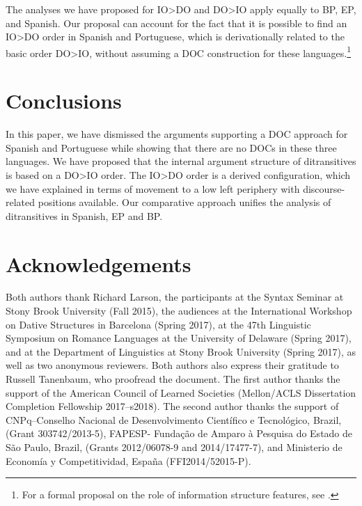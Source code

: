 \documentclass[output=paper,colorlinks,citecolor=brown,nonflat]{./langscibook}
\begin{document}
The analyses we have proposed for IO>DO and DO>IO apply equally to BP, EP, and Spanish. Our proposal can account for the fact that it is possible to find an IO>DO order in Spanish and Portuguese, which is derivationally related to the basic order DO>IO, without assuming a DOC construction for these languages.\footnote{For a formal proposal on the role of information structure features, see \citet{CépedaCyrino2017}.}

\section{Conclusions}\label{sec:cepeda:4}

In this paper, we have dismissed the arguments supporting a DOC approach for Spanish and Portuguese while showing that there are no DOCs in these three languages. We have proposed that the internal argument structure of ditransitives is based on a DO>IO order. The IO>DO order is a derived configuration, which we have explained in terms of movement to a low left periphery with discourse-related positions available. Our comparative approach unifies the analysis of ditransitives in Spanish, EP and BP.


\section*{Acknowledgements}
Both authors thank Richard Larson, the participants at the Syntax Seminar at Stony Brook University (Fall 2015), the audiences at the International Workshop on Dative Structures in Barcelona (Spring 2017), at the 47th Linguistic Symposium on Romance Languages at the University of Delaware (Spring 2017), and at the Department of Linguistics at Stony Brook University (Spring 2017), as well as two anonymous reviewers. Both authors also express their gratitude to Russell Tanenbaum, who proofread the document. The first author thanks the support of the American Council of Learned Societies (Mellon/ACLS Dissertation Completion Fellowship 2017--s2018). The second author thanks the support of CNPq–Conselho Nacional de Desenvolvimento Científico e Tecnológico, Brazil, (Grant 303742/2013-5), FAPESP- Fundação de Amparo à Pesquisa do Estado de São Paulo, Brazil, (Grants 2012/06078-9 and 2014/17477-7), and Ministerio de Economía y Competitividad, España (FFI2014/52015-P).

\sloppy\printbibliography[heading=subbibliography,notkeyword=this]
\end{document}
